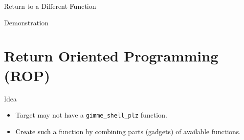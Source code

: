 \documentclass[beamer]{uibk}
\begin{document}
\begin{frame}{Return to a Different Function}
    \begin{center}
        \huge Demonstration
    \end{center}
\end{frame}

\section{Return Oriented Programming (ROP)}

\begin{frame}{Idea}
    \begin{itemize}
        \item Target may not have a \texttt{gimme\_shell\_plz} function.
        \bigskip
        \pause
        \item Create such a function by combining parts (gadgets) of available
            functions.
    \end{itemize}
\end{frame}
\end{document}
